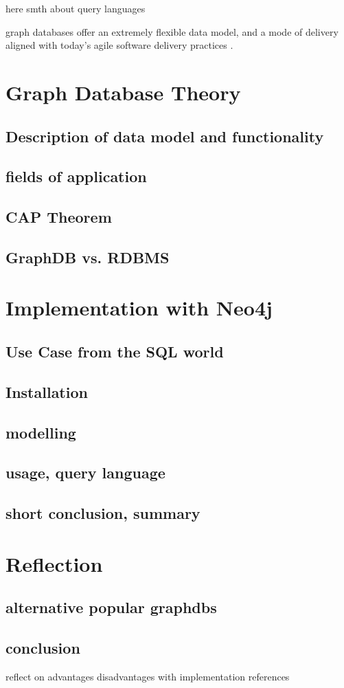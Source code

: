 here smth about query languages

graph databases offer an extremely flexible data model, and a mode of delivery aligned with today’s agile software delivery practices \cite{Robinson2013}.



\section{Graph Database Theory}
\subsection{Description of data model and functionality}
\subsection{fields of application}
\subsection{CAP Theorem}
\subsection{GraphDB vs. RDBMS}

\section{Implementation with Neo4j}
\subsection{Use Case from the SQL world}
\subsection{Installation}
\subsection{modelling}
\subsection{usage, query language}
\subsection{short conclusion, summary}

\section{Reflection}
\subsection{alternative popular graphdbs}
\subsection{conclusion}
reflect on advantages disadvantages with implementation references

